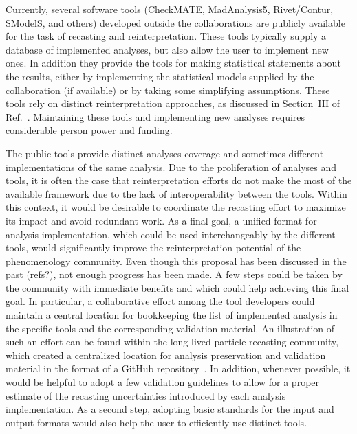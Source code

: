 \documentclass[11pt]{article}
\begin{document}
Currently, several software tools (CheckMATE, MadAnalysis5, Rivet/Contur, SModelS, and others) developed outside the collaborations are publicly available for the task of recasting and reinterpretation. These tools typically supply a database of implemented analyses, but also allow the user to implement new ones.
In addition they provide the tools for making statistical statements about the results, either by implementing the statistical models supplied by the collaboration (if available) or by taking some simplifying assumptions.
These tools rely on distinct reinterpretation approaches, as discussed in Section~III of Ref.~\cite{LHCReinterpretationForum:2020xtr}.
Maintaining these tools and implementing new analyses requires considerable person power and funding.

The public tools provide distinct analyses coverage and sometimes different implementations of the same analysis.
Due to the proliferation of analyses and tools, it is often the case that reinterpretation efforts do not make the most of the available framework due to the lack of interoperability between the tools.
Within this context, it would be desirable to coordinate the \gls{recasting} effort to maximize its impact and avoid redundant work. 
As a final goal, a unified format for analysis implementation, which could be used interchangeably by the different tools, would significantly improve the reinterpretation potential of the phenomenology community.
Even though this proposal has been discussed in the past (refs?), not enough progress has been made.
A few steps could be taken by the community with immediate benefits and which could help achieving this final goal.
In particular, a collaborative effort among the tool developers could maintain a central location for bookkeeping the list of implemented analysis in the specific tools and the corresponding validation material.
An illustration of such an effort can be found within the 
long-lived particle \gls{recasting} community, which created a centralized location for \gls{analysis preservation} and validation material in the format of a GitHub repository~\cite{llpRepo}.
In addition, whenever possible, it would be helpful to adopt a few validation guidelines to allow for a proper estimate of the recasting uncertainties introduced by each analysis implementation.
As a second step, adopting basic standards for the input and output formats would also help the user to efficiently use distinct tools.
\end{document}
